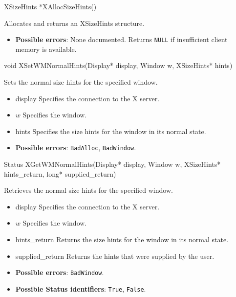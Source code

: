 \documentclass{report}
\begin{document}
\begin{itemize}
            \begin{cppcode}
                XSizeHints *XAllocSizeHints()
            \end{cppcode}
            \bigbreak \noindent
            Allocates and returns an XSizeHints structure.

            \begin{itemize}
                \item \textbf{Possible errors}: None documented. Returns \texttt{NULL} if insufficient client memory is available.
            \end{itemize}

            \begin{cppcode}
                void XSetWMNormalHints(Display* display, Window w, XSizeHints* hints)
            \end{cppcode}
            \bigbreak \noindent
            Sets the normal size hints for the specified window.

            \begin{itemize}
                \item display Specifies the connection to the X server.
                \item $w$ Specifies the window.
                \item hints Specifies the size hints for the window in its normal state.
            \end{itemize}

            \begin{itemize}
                \item \textbf{Possible errors}: \texttt{BadAlloc}, \texttt{BadWindow}.
            \end{itemize}

            \begin{cppcode}
            Status XGetWMNormalHints(Display* display, Window w, XSizeHints* hints_return, long* supplied_return)
            \end{cppcode}
            \bigbreak \noindent
            Retrieves the normal size hints for the specified window.
            \begin{itemize}
                \item display Specifies the connection to the X server.
                \item $w$ Specifies the window.
                \item hints\_return Returns the size hints for the window in its normal state.
                \item supplied\_return Returns the hints that were supplied by the user.
            \end{itemize}
            \begin{itemize}
                \item \textbf{Possible errors}: \texttt{BadWindow}.
                \item \textbf{Possible Status identifiers}: \texttt{True}, \texttt{False}.
            \end{itemize}


\end{itemize}
\end{document}
